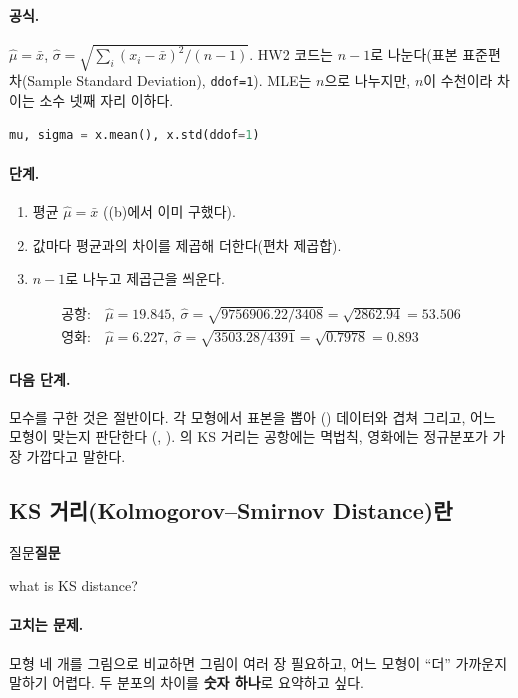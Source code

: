 \documentclass[11pt]{article}
\newenvironment{callout}[1][]
  {\par\medskip\noindent
   \begin{lrbox}{\calloutbox}\begin{minipage}{0.92\linewidth}
   \def\calloutttl{#1}\ifx\calloutttl\empty\else\textbf{#1}\par\smallskip\fi}
  {\end{minipage}\end{lrbox}%
   \fcolorbox{black!30}{black!3}{\usebox{\calloutbox}}\par\medskip}
\newcommand{\term}[1]{\textbf{#1}}
\begin{document}
\paragraph{공식.} $\hat\mu = \bar x$, $\hat\sigma = \sqrt{\sum_i (x_i - \bar x)^2 / (n-1)}$.
HW2 코드는 $n-1$로 나눈다(표본 표준편차(Sample Standard Deviation), \texttt{ddof=1}).
MLE는 $n$으로 나누지만, $n$이 수천이라 차이는 소수 넷째 자리 이하다.
\begin{lstlisting}[language=Python]
mu, sigma = x.mean(), x.std(ddof=1)
\end{lstlisting}
\paragraph{단계.}
\begin{enumerate}
  \item 평균 $\hat\mu = \bar x$ ((b)에서 이미 구했다).
  \item 값마다 평균과의 차이를 제곱해 더한다(편차 제곱합).
  \item $n - 1$로 나누고 제곱근을 씌운다.
\end{enumerate}
\begin{align*}
  \text{공항:}\ &\hat\mu = 19.845,\ \hat\sigma = \sqrt{9756906.22 / 3408} = \sqrt{2862.94} = 53.506 \\
  \text{영화:}\ &\hat\mu = 6.227,\ \hat\sigma = \sqrt{3503.28 / 4391} = \sqrt{0.7978} = 0.893
\end{align*}

\paragraph{다음 단계.} 모수를 구한 것은 절반이다. 각 모형에서 표본을 뽑아
() 데이터와 겹쳐 그리고, 어느 모형이 맞는지 판단한다
(, ). 의 KS 거리는
공항에는 멱법칙, 영화에는 정규분포가 가장 가깝다고 말한다.

\subsection{KS 거리(Kolmogorov--Smirnov Distance)란}
\label{sec:ks}

\begin{callout}[질문]
what is KS distance?
\end{callout}

\paragraph{고치는 문제.} 모형 네 개를 그림으로 비교하면 그림이 여러 장 필요하고, 어느
모형이 ``더'' 가까운지 말하기 어렵다. 두 분포의 차이를 \term{숫자 하나}로 요약하고 싶다.
\end{document}
